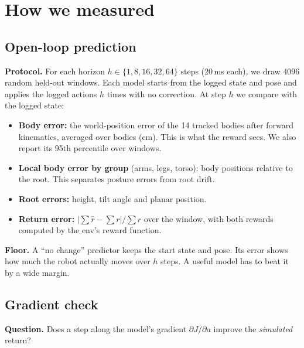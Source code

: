 \documentclass[10pt]{article}
\begin{document}
\section{How we measured}

\subsection{Open-loop prediction}

\textbf{Protocol.} For each horizon $h \in \{1, 8, 16, 32, 64\}$ steps (20\,ms each), we draw 4096
random held-out windows. Each model starts from the logged state and pose and applies the logged
actions $h$ times with no correction. At step $h$ we compare with the logged state:
\begin{itemize}
  \item \textbf{Body error:} the world-position error of the 14 tracked bodies after forward
  kinematics, averaged over bodies (cm). This is what the reward sees. We also report its 95th
  percentile over windows.
  \item \textbf{Local body error by group} (arms, legs, torso): body positions relative to the root.
  This separates posture errors from root drift.
  \item \textbf{Root errors:} height, tilt angle and planar position.
  \item \textbf{Return error:} $|\sum\hat r - \sum r| / \sum r$ over the window, with both rewards
  computed by the env's reward function.
\end{itemize}

\textbf{Floor.} A ``no change'' predictor keeps the start state and pose. Its error shows how much the
robot actually moves over $h$ steps. A useful model has to beat it by a wide margin.

\subsection{Gradient check}

\textbf{Question.} Does a step along the model's gradient $\partial J/\partial a$ improve the
\emph{simulated} return?
\end{document}
